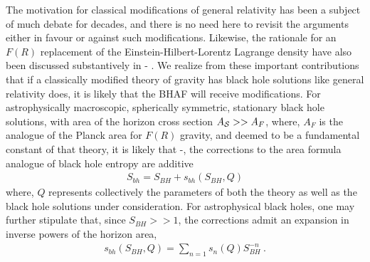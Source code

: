 \documentclass[11pt]{article}
\begin{document}
The motivation for classical modifications of general relativity has been a subject of much debate for decades, and there is no need here to revisit the arguments either in favour or against such modifications. Likewise, the rationale for an $F(R)$ replacement of the Einstein-Hilbert-Lorentz Lagrange density have also been discussed substantively in \cite{bre2004} - \cite{mod2011}. We realize from these important contributions that if a classically modified theory of gravity has black hole solutions like general relativity does, it is likely that the BHAF will receive modifications. For astrophysically macroscopic, spherically symmetric, stationary black hole solutions, with area of the horizon cross section $A_{\cal S} >> A_F$, where, $A_F$ is the analogue of the Planck area for $F(R)$ gravity, and deemed to be a fundamental constant of that theory, it is likely that \cite{pm2025}-\cite{pm2026}, the corrections to the area formula analogue of black hole entropy are additive
\begin{eqnarray}
S_{bh} = S_{BH} + s_{bh}(S_{BH}, Q) \label{cor}
\end{eqnarray} 
where, $Q$ represents collectively the parameters of both the theory as well as the black hole solutions under consideration. For astrophysical black holes, one may further stipulate that, since $S_{BH} >> 1$, the corrections admit an expansion in inverse powers of  the horizon area,
\begin{eqnarray}
s_{bh}(S_{BH},Q) = \sum_{n=1} s_n(Q) S_{BH}^{-n} ~. \label{expn} 
\end{eqnarray}  
\end{document}
